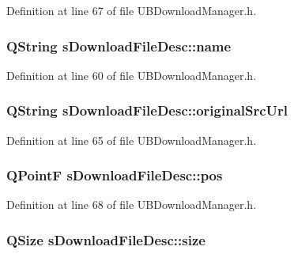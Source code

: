 Definition at line 67 of file U\-B\-Download\-Manager.\-h.

\hypertarget{structs_download_file_desc_a77186047aac4272ab2dbfff324911214}{
\subsubsection[{name}]{\setlength{\rightskip}{0pt plus 5cm}Q\-String s\-Download\-File\-Desc\-::name}}\label{d5/d15/structs_download_file_desc_a77186047aac4272ab2dbfff324911214}


Definition at line 60 of file U\-B\-Download\-Manager.\-h.

\hypertarget{structs_download_file_desc_a1b6e4c982c432d3db9339e2eab20ab81}{
\subsubsection[{original\-Src\-Url}]{\setlength{\rightskip}{0pt plus 5cm}Q\-String s\-Download\-File\-Desc\-::original\-Src\-Url}}\label{d5/d15/structs_download_file_desc_a1b6e4c982c432d3db9339e2eab20ab81}


Definition at line 65 of file U\-B\-Download\-Manager.\-h.

\hypertarget{structs_download_file_desc_a187d0504d19892e2d483f47a349b6194}{
\subsubsection[{pos}]{\setlength{\rightskip}{0pt plus 5cm}Q\-Point\-F s\-Download\-File\-Desc\-::pos}}\label{d5/d15/structs_download_file_desc_a187d0504d19892e2d483f47a349b6194}


Definition at line 68 of file U\-B\-Download\-Manager.\-h.

\hypertarget{structs_download_file_desc_aff74b0da56f2a5921847c1ab5c013476}{
\subsubsection[{size}]{\setlength{\rightskip}{0pt plus 5cm}Q\-Size s\-Download\-File\-Desc\-::size}}\label{d5/d15/structs_download_file_desc_aff74b0da56f2a5921847c1ab5c013476}



